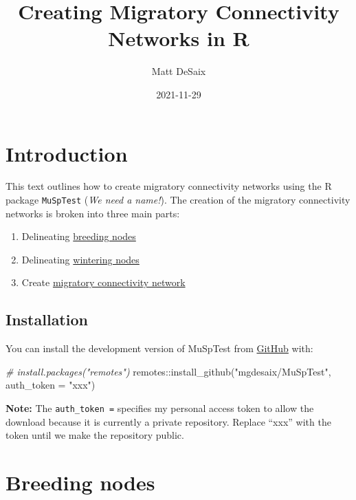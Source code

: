 \documentclass[
]{book}
\title{Creating Migratory Connectivity Networks in R}
\author{Matt DeSaix}
\date{2021-11-29}
\newenvironment{Shaded}{\begin{snugshade}}{\end{snugshade}}
\newcommand{\AttributeTok}[1]{\textcolor[rgb]{0.77,0.63,0.00}{#1}}
\newcommand{\CommentTok}[1]{\textcolor[rgb]{0.56,0.35,0.01}{\textit{#1}}}
\newcommand{\FunctionTok}[1]{\textcolor[rgb]{0.00,0.00,0.00}{#1}}
\newcommand{\NormalTok}[1]{#1}
\newcommand{\SpecialCharTok}[1]{\textcolor[rgb]{0.00,0.00,0.00}{#1}}
\newcommand{\StringTok}[1]{\textcolor[rgb]{0.31,0.60,0.02}{#1}}
\providecommand{\tightlist}{%
  \setlength{\itemsep}{0pt}\setlength{\parskip}{0pt}}
\begin{document}
\maketitle

{
\setcounter{tocdepth}{1}
\tableofcontents
}
\hypertarget{introduction}{%
\chapter{Introduction}\label{introduction}}

This text outlines how to create migratory connectivity networks using the R package \texttt{MuSpTest} (\emph{We need a name!}). The creation of the migratory connectivity networks is broken into three main parts:

\begin{enumerate}
\def\labelenumi{\arabic{enumi}.}
\tightlist
\item
  Delineating \protect\hyperlink{breeding}{breeding nodes}
\item
  Delineating \protect\hyperlink{wintering}{wintering nodes}
\item
  Create \protect\hyperlink{connectivity}{migratory connectivity network}
\end{enumerate}

\hypertarget{installation}{%
\section{Installation}\label{installation}}

You can install the development version of MuSpTest from \href{https://github.com/}{GitHub} with:

\begin{Shaded}
\begin{Highlighting}[]
\CommentTok{\# install.packages("remotes")}
\NormalTok{remotes}\SpecialCharTok{::}\FunctionTok{install\_github}\NormalTok{(}\StringTok{"mgdesaix/MuSpTest"}\NormalTok{, }\AttributeTok{auth\_token =} \StringTok{"xxx"}\NormalTok{)}
\end{Highlighting}
\end{Shaded}

\textbf{Note:} The \texttt{auth\_token\ =} specifies my personal access token to allow the download because it is currently a private repository. Replace ``xxx'' with the token until we make the repository public.

\hypertarget{breeding}{%
\chapter{Breeding nodes}\label{breeding}}
\end{document}
